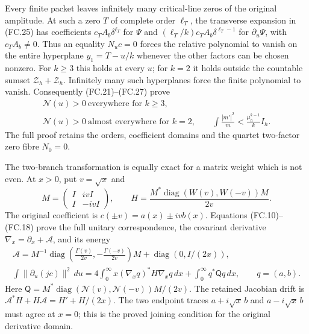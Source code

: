 Every finite packet leaves infinitely many critical-line zeros of
the original amplitude. At such a zero \(T\) of complete order
\(\ell_T\), the transverse expansion in (FC.25) has coefficients
\(c_TA_b\delta^{\ell_T}\) for \(\Psi\) and
\((\ell_T/k)c_TA_b\delta^{\ell_T-1}\) for \(\partial_u\Psi\),
with \(c_TA_b\ne0\). Thus an equality \(N_uc=0\) forces the
relative polynomial to vanish on the entire hyperplane
\(y_1=T-u/k\) whenever the other factors can be chosen nonzero.
For \(k\ge3\) this holds at every \(u\); for \(k=2\) it holds
outside the countable sumset \(\mathcal Z_h+\mathcal Z_h\).
Infinitely many such hyperplanes force the finite polynomial to
vanish. Consequently (FC.21)--(FC.27) prove
\[
 \begin{gathered}
 \mathcal N(u)>0\ \text{everywhere for }k\ge3,\\
 \mathcal N(u)>0\ \text{almost everywhere for }k=2,\qquad
 \int\frac{|m'|^2}{m}<\frac{\mu_h^{k-1}}kI_h .
 \end{gathered}
 \tag{R21}
\]
The full proof retains the orders, coefficient domains and the
quartet two-factor zero fibre \(N_0=0\).

The two-branch transformation is equally exact for a matrix
weight which is not even. At \(x>0\), put \(v=\sqrt x\) and
\[
 M=\begin{pmatrix}I&ivI\\I&-ivI\end{pmatrix},\qquad
 H=\frac{M^*\operatorname{diag}(W(v),W(-v))M}{2v}.
\]
The original coefficient is \(c(\pm v)=a(x)\pm ivb(x)\).
Equations (FC.10)--(FC.18) prove the full unitary correspondence,
the covariant derivative \(\nabla_x=\partial_x+\mathcal A\),
and its energy
\[
 \begin{gathered}
 \mathcal A=M^{-1}
   \operatorname{diag}\!\left(\frac{\Gamma(v)}{2v},
                         -\frac{\Gamma(-v)}{2v}\right)M
                    +\operatorname{diag}(0,I/(2x)),\\
 \int\|\partial_u(jc)\|^2\,du
   =4\int_0^\infty x(\nabla_xq)^*H\nabla_xq\,dx
                      +\int_0^\infty q^*\mathsf Qq\,dx ,
 \qquad q=(a,b).
 \end{gathered}
 \tag{R22}
\]
Here \(\mathsf Q=M^*\operatorname{diag}(\mathcal N(v),
\mathcal N(-v))M/(2v)\). The retained Jacobian drift is
\(\mathcal A^*H+H\mathcal A=H'+H/(2x)\).
The two endpoint traces \(a+i\sqrt x\,b\) and
\(a-i\sqrt x\,b\) must agree at \(x=0\); this is the proved
joining condition for the original derivative domain.

